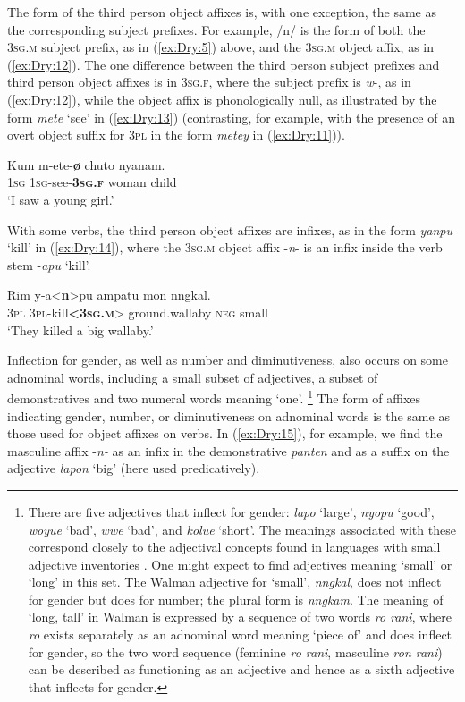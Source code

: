 \documentclass[output=collectionpaper]{langsci/langscibook}
\begin{document}
The form of the third person object affixes is, with one exception, the same as the corresponding subject prefixes. For example, /n/ is the form of both the \textsc{3sg.m} subject prefix, as in (\ref{ex:Dry:5}) above, and the \textsc{3sg.m} object affix, as in (\ref{ex:Dry:12}). The one difference between the third person subject prefixes and third person object affixes is in \textsc{3sg.f}, where the subject prefix is \textit{w}{}-, as in (\ref{ex:Dry:12}), while the object affix is phonologically null, as illustrated by the form \textit{mete} `see' in (\ref{ex:Dry:13}) (contrasting, for example, with the presence of an overt object suffix for \textsc{3pl} in the form \textit{metey} in (\ref{ex:Dry:11})).

\ea  \label{ex:Dry:13}
\gll Kum	m-ete-\textbf{ø}	chuto	nyanam.\\
\textsc{1sg} \textsc{1sg}-see-\textbf{\textsc{3sg.f}} woman child\\
\glt `I saw a young girl.'
\z

With some verbs, the third person object affixes are infixes, as in the form \textit{yanpu} `kill' in (\ref{ex:Dry:14}), where the \textsc{3sg.m} object affix -\textit{n}{}- is an infix inside the verb stem -\textit{apu} `kill'.

\ea  \label{ex:Dry:14}
\gll Rim	y-a<\textbf{n}>pu	ampatu	mon	nngkal.\\
\textsc{3pl} \textsc{3pl}-kill\textbf{<\textsc{3sg.m}}> ground.wallaby \textsc{neg}  small\\
\glt `They killed a big wallaby.'
\z

Inflection for gender, as well as number and diminutiveness, also occurs on some adnominal words, including a small subset of adjectives, a subset of demonstratives and two numeral words meaning `one'.%
\footnote{There are five adjectives that inflect for gender: \textit{lapo} `large', \textit{nyopu} `good', \textit{woyue} `bad', \textit{wwe} `bad', and \textit{kolue} `short'. The meanings associated with these correspond closely to the adjectival concepts found in languages with small adjective inventories \citep{Dixon1977}. One might expect to find adjectives meaning `small' or `long' in this set. The Walman adjective for `small', \textit{nngkal}, does not inflect for gender but does for number; the plural form is \textit{nngkam}. The meaning of `long, tall' in Walman is expressed by a sequence of two words \textit{ro rani}, where \textit{ro} exists separately as an adnominal word meaning `piece of' and does inflect for gender, so the two word sequence (feminine \textit{ro rani}, masculine \textit{ron rani}) can be described as functioning as an adjective and hence as a sixth adjective that inflects for gender.} The form of affixes indicating gender, number, or diminutiveness on adnominal words is the same as those used for object affixes on verbs. In (\ref{ex:Dry:15}), for example, we find the masculine affix -\textit{n-} as an infix in the demonstrative \textit{panten} and as a suffix on the adjective \textit{lapon} `big' (here used predicatively).
\end{document}
